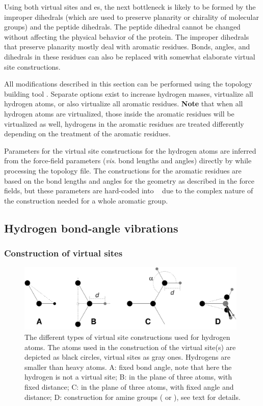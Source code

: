 Using both virtual sites and es, the next
bottleneck is likely to be formed by the improper dihedrals (which are
used to preserve planarity or chirality of molecular groups) and the
peptide dihedrals. The peptide dihedral cannot be changed without
affecting the physical behavior of the protein. The improper dihedrals
that preserve planarity mostly deal with aromatic residues. Bonds,
angles, and dihedrals in these residues can also be replaced with
somewhat elaborate virtual site constructions.

All modifications described in this section can be performed using the
{\gromacs} topology building tool {\tt {}}. Separate
options exist to increase hydrogen masses, virtualize all hydrogen atoms,
or also virtualize all aromatic residues. {\bf Note} that when all hydrogen
atoms are virtualized, those inside the aromatic residues will be
virtualized as well, {\ie} hydrogens in the aromatic residues are treated
differently depending on the treatment of the aromatic residues.

Parameters for the virtual site constructions for the hydrogen atoms are
inferred from the force-field parameters ({\em vis}. bond lengths and
angles) directly by {\tt {}} while processing the
topology file.  The constructions for the aromatic residues are based
on the bond lengths and angles for the geometry as described in the
force fields, but these parameters are hard-coded into {\tt
{}} due to the complex nature of the construction
needed for a whole aromatic group.

\subsection{Hydrogen bond-angle vibrations}
\label{sec:vsitehydro}
\subsubsection{Construction of virtual sites} %
\begin{figure}
\centerline{\includegraphics[width=11cm]{plots/dumtypes}}
\caption[Virtual site constructions for hydrogen atoms.]{The different
types of virtual site constructions used for hydrogen atoms. The atoms
used in the construction of the virtual site(s) are depicted as black
circles, virtual sites as gray ones. Hydrogens are smaller than heavy
atoms. {\sf A}: fixed bond angle, note that here the hydrogen is not a
virtual site; {\sf B}: in the plane of three atoms, with fixed distance;
{\sf C}: in the plane of three atoms, with fixed angle and distance;
{\sf D}: construction for amine groups ({\amine} or {\aminep}), see
text for details.}
\label{fig:vsitehydro}
\end{figure}

